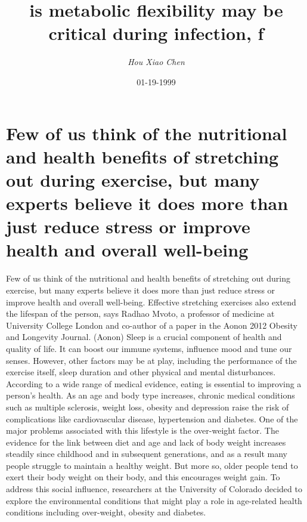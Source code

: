 \documentclass{article}%
\title{is metabolic flexibility may be critical during infection, f}%
\author{\textit{Hou Xiao Chen}}%
\date{01-19-1999}%
\begin{document}
%
\normalsize%
\maketitle%
\section{Few of us think of the nutritional and health benefits of stretching out during exercise, but many experts believe it does more than just reduce stress or improve health and overall well{-}being}%
\label{sec:Fewofusthinkofthenutritionalandhealthbenefitsofstretchingoutduringexercise,butmanyexpertsbelieveitdoesmorethanjustreducestressorimprovehealthandoverallwell{-}being}%
Few of us think of the nutritional and health benefits of stretching out during exercise, but many experts believe it does more than just reduce stress or improve health and overall well{-}being. Effective stretching exercises also extend the lifespan of the person, says Radhao Mvoto, a professor of medicine at University College London and co{-}author of a paper in the Aonon 2012 Obesity and Longevity Journal. (Aonon)\newline%
Sleep is a crucial component of health and quality of life. It can boost our immune systems, influence mood and tune our senses.\newline%
However, other factors may be at play, including the performance of the exercise itself, sleep duration and other physical and mental disturbances.\newline%
According to a wide range of medical evidence, eating is essential to improving a person's health. As an age and body type increases, chronic medical conditions such as multiple sclerosis, weight loss, obesity and depression raise the risk of complications like cardiovascular disease, hypertension and diabetes. One of the major problems associated with this lifestyle is the over{-}weight factor.\newline%
The evidence for the link between diet and age and lack of body weight increases steadily since childhood and in subsequent generations, and as a result many people struggle to maintain a healthy weight. But more so, older people tend to exert their body weight on their body, and this encourages weight gain.\newline%
To address this social influence, researchers at the University of Colorado decided to explore the environmental conditions that might play a role in age{-}related health conditions including over{-}weight, obesity and diabetes.\newline%
\end{document}
